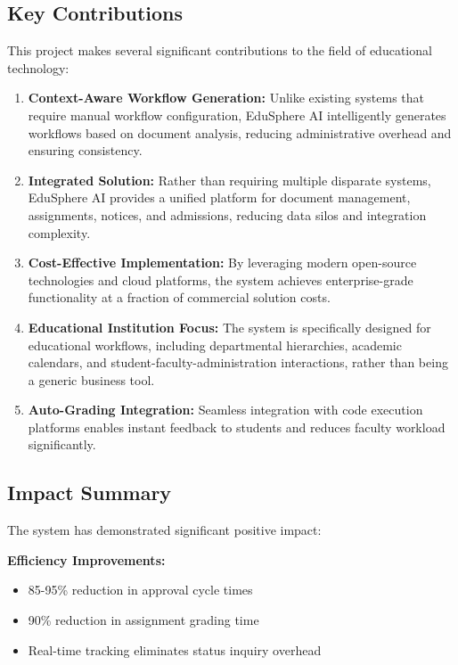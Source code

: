 \subsection{Key Contributions}

This project makes several significant contributions to the field of educational technology:

\begin{enumerate}
\item \textbf{Context-Aware Workflow Generation:} Unlike existing systems that require manual workflow configuration, EduSphere AI intelligently generates workflows based on document analysis, reducing administrative overhead and ensuring consistency.

\item \textbf{Integrated Solution:} Rather than requiring multiple disparate systems, EduSphere AI provides a unified platform for document management, assignments, notices, and admissions, reducing data silos and integration complexity.

\item \textbf{Cost-Effective Implementation:} By leveraging modern open-source technologies and cloud platforms, the system achieves enterprise-grade functionality at a fraction of commercial solution costs.

\item \textbf{Educational Institution Focus:} The system is specifically designed for educational workflows, including departmental hierarchies, academic calendars, and student-faculty-administration interactions, rather than being a generic business tool.

\item \textbf{Auto-Grading Integration:} Seamless integration with code execution platforms enables instant feedback to students and reduces faculty workload significantly.
\end{enumerate}

\subsection{Impact Summary}

The system has demonstrated significant positive impact:

\textbf{Efficiency Improvements:}
\begin{itemize}
\item 85-95\% reduction in approval cycle times
\item 90\% reduction in assignment grading time
\item Real-time tracking eliminates status inquiry overhead
\end{itemize}

